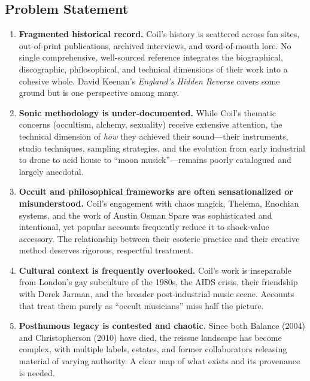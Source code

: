 \documentclass[11pt,letterpaper]{article}
\begin{document}
\subsection{Problem Statement}

\begin{enumerate}[label=\arabic*., leftmargin=2em]
\item \textbf{Fragmented historical record.} Coil's history is scattered across fan sites, out-of-print publications, archived interviews, and word-of-mouth lore. No single comprehensive, well-sourced reference integrates the biographical, discographic, philosophical, and technical dimensions of their work into a cohesive whole. David Keenan's \textit{England's Hidden Reverse} covers some ground but is one perspective among many.

\item \textbf{Sonic methodology is under-documented.} While Coil's thematic concerns (occultism, alchemy, sexuality) receive extensive attention, the technical dimension of \textit{how} they achieved their sound---their instruments, studio techniques, sampling strategies, and the evolution from early industrial to drone to acid house to ``moon musick''---remains poorly catalogued and largely anecdotal.

\item \textbf{Occult and philosophical frameworks are often sensationalized or misunderstood.} Coil's engagement with chaos magick, Thelema, Enochian systems, and the work of Austin Osman Spare was sophisticated and intentional, yet popular accounts frequently reduce it to shock-value accessory. The relationship between their esoteric practice and their creative method deserves rigorous, respectful treatment.

\item \textbf{Cultural context is frequently overlooked.} Coil's work is inseparable from London's gay subculture of the 1980s, the AIDS crisis, their friendship with Derek Jarman, and the broader post-industrial music scene. Accounts that treat them purely as ``occult musicians'' miss half the picture.

\item \textbf{Posthumous legacy is contested and chaotic.} Since both Balance (2004) and Christopherson (2010) have died, the reissue landscape has become complex, with multiple labels, estates, and former collaborators releasing material of varying authority. A clear map of what exists and its provenance is needed.
\end{enumerate}
\end{document}
